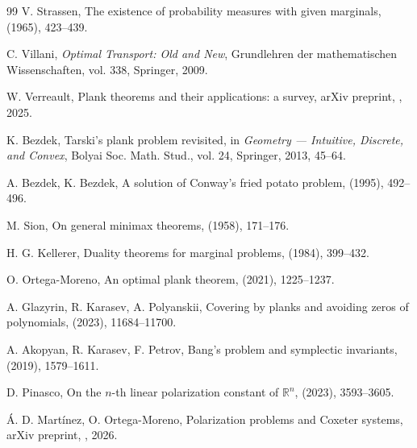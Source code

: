 \documentclass{aims}
\numberwithin{equation}{section}
\theoremstyle{plain}
\theoremstyle{definition}
\theoremstyle{remark}
\begin{document}
\begin{thebibliography}{99}
 V. Strassen, {The existence of probability measures with given marginals},   (1965), 423--439. 

 C. Villani, {\em Optimal Transport: Old and New}, Grundlehren der mathematischen Wissenschaften, vol. 338, Springer, 2009. 

 W. Verreault, {Plank theorems and their applications: a survey}, arXiv preprint, , 2025.

 K. Bezdek, {Tarski's plank problem revisited}, in {\em Geometry --- Intuitive, Discrete, and Convex}, Bolyai Soc. Math. Stud., vol. 24, Springer, 2013, 45--64. 

 A. Bezdek, K. Bezdek, {A solution of Conway's fried potato problem},   (1995), 492--496. 

 M. Sion, {On general minimax theorems},   (1958), 171--176. 

 H. G. Kellerer, {Duality theorems for marginal problems},   (1984), 399--432. 

 O. Ortega-Moreno, {An optimal plank theorem},   (2021), 1225--1237. 

 A. Glazyrin, R. Karasev, A. Polyanskii, {Covering by planks and avoiding zeros of polynomials},   (2023), 11684--11700. 

 A. Akopyan, R. Karasev, F. Petrov, {Bang's problem and symplectic invariants},   (2019), 1579--1611. 

 D. Pinasco, {On the $n$-th linear polarization constant of $\mathbb{R}^n$},   (2023), 3593--3605. 

 \'A. D. Mart\'inez, O. Ortega-Moreno, {Polarization problems and Coxeter systems}, arXiv preprint, , 2026.


\end{thebibliography}
\end{document}
